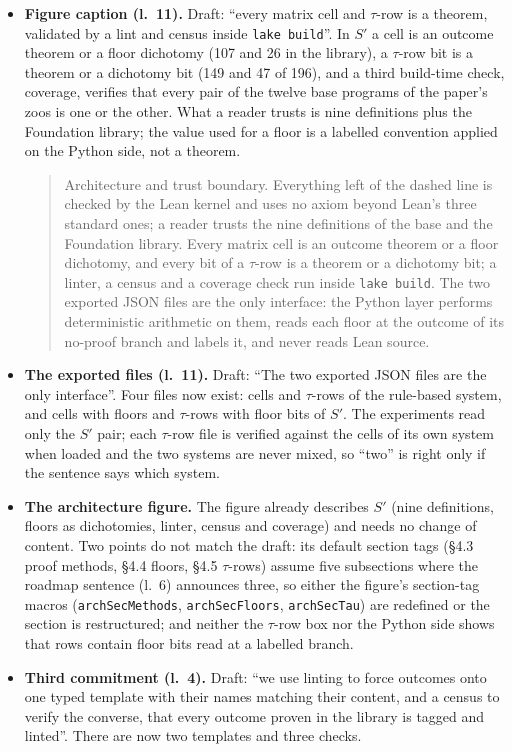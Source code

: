 \begin{itemize}
\item \textbf{Figure caption (l.~11).} Draft: ``every matrix cell and $\tau$-row is a theorem, validated by a lint and census inside \texttt{lake build}''. In $S'$ a cell is an outcome theorem or a floor dichotomy (107 and 26 in the library), a $\tau$-row bit is a theorem or a dichotomy bit (149 and 47 of 196), and a third build-time check, coverage, verifies that every pair of the twelve base programs of the paper's zoos is one or the other. What a reader trusts is nine definitions plus the Foundation library; the value used for a floor is a labelled convention applied on the Python side, not a theorem.
\begin{quote}
Architecture and trust boundary. Everything left of the dashed line is checked by the Lean kernel and uses no axiom beyond Lean's three standard ones; a reader trusts the nine definitions of the base and the Foundation library. Every matrix cell is an outcome theorem or a floor dichotomy, and every bit of a $\tau$-row is a theorem or a dichotomy bit; a linter, a census and a coverage check run inside \texttt{lake build}. The two exported JSON files are the only interface: the Python layer performs deterministic arithmetic on them, reads each floor at the outcome of its no-proof branch and labels it, and never reads Lean source.
\end{quote}
\item \textbf{The exported files (l.~11).} Draft: ``The two exported JSON files are the only interface''. Four files now exist: cells and $\tau$-rows of the rule-based system, and cells with floors and $\tau$-rows with floor bits of $S'$. The experiments read only the $S'$ pair; each $\tau$-row file is verified against the cells of its own system when loaded and the two systems are never mixed, so ``two'' is right only if the sentence says which system.
\item \textbf{The architecture figure.} The figure already describes $S'$ (nine definitions, floors as dichotomies, linter, census and coverage) and needs no change of content. Two points do not match the draft: its default section tags (\S4.3 proof methods, \S4.4 floors, \S4.5 $\tau$-rows) assume five subsections where the roadmap sentence (l.~6) announces three, so either the figure's section-tag macros (\texttt{archSecMethods}, \texttt{archSecFloors}, \texttt{archSecTau}) are redefined or the section is restructured; and neither the $\tau$-row box nor the Python side shows that rows contain floor bits read at a labelled branch.
\item \textbf{Third commitment (l.~4).} Draft: ``we use linting to force outcomes onto one typed template with their names matching their content, and a census to verify the converse, that every outcome proven in the library is tagged and linted''. There are now two templates and three checks.

\end{itemize}
